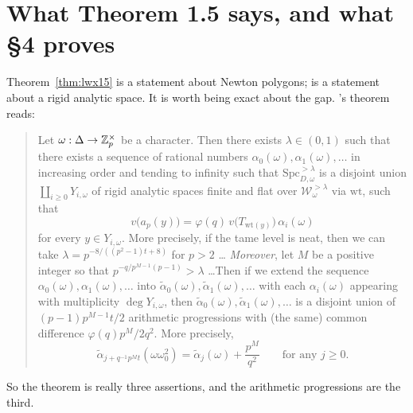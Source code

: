 \section{What Theorem 1.5 says, and what \S4 proves}
\label{sec:what-15-says}

Theorem~\ref{thm:lwx15} is a statement about Newton polygons; \cite[Theorem 1.5]{LWX} is a
statement about a rigid analytic space.  It is worth being exact about the gap.  \cite{LWX}'s
theorem reads:

\begin{quote}
  Let $\omega : \Delta \to \mathbb{Z}_p^{\times}$ be a character.  Then there exists
  $\lambda \in (0,1)$ such that there exists a sequence of rational numbers
  $\alpha_0(\omega), \alpha_1(\omega), \dots$ in increasing order and tending to infinity such
  that $\mathrm{Spc}^{>\lambda}_{D,\omega}$ is a disjoint union
  $\coprod_{i\geq 0} Y_{i,\omega}$ of rigid analytic spaces finite and flat over
  $\mathcal{W}^{>\lambda}_\omega$ via $\mathrm{wt}$, such that
  \[
    v\bigl(a_p(y)\bigr) = \varphi(q)\,v\bigl(T_{\mathrm{wt}(y)}\bigr)\,\alpha_i(\omega)
    \tag{1.5.1}
  \]
  for every $y \in Y_{i,\omega}$.  More precisely, if the tame level is neat, then we can take
  $\lambda = p^{-8/((p^{2}-1)t+8)}$ for $p > 2$ \dots
  \emph{Moreover}, let $M$ be a positive integer so that $p^{-q/p^{M-1}(p-1)} > \lambda$
  \dots  Then if we extend the sequence $\alpha_0(\omega), \alpha_1(\omega),\dots$ into
  $\tilde\alpha_0(\omega), \tilde\alpha_1(\omega), \dots$ with each $\alpha_i(\omega)$ appearing
  with multiplicity $\deg Y_{i,\omega}$, then
  $\tilde\alpha_0(\omega), \tilde\alpha_1(\omega), \dots$ is a disjoint union of
  $(p-1)p^{M-1}t/2$ arithmetic progressions with (the same) common difference
  $\varphi(q)p^{M}/2q^{2}$.  More precisely,
  \[
    \tilde\alpha_{j + q^{-1}p^{M}t}(\omega\omega_0^{2})
      = \tilde\alpha_j(\omega) + \frac{p^{M}}{q^{2}}
    \qquad\text{for any } j \geq 0.
    \tag{1.5.2}
  \]
\end{quote}

So the theorem is really three assertions, and the arithmetic progressions are the third.

